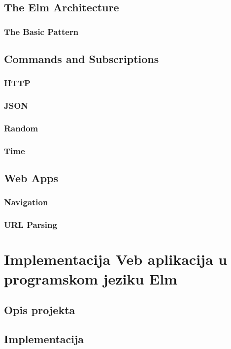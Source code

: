 \documentclass{viser-thesis}
\begin{document}
\subsection{The Elm Architecture}
\subsubsection{The Basic Pattern}

\subsection{Commands and Subscriptions}
\subsubsection{HTTP}
\subsubsection{JSON}
\subsubsection{Random}
\subsubsection{Time}

\subsection{Web Apps}
\subsubsection{Navigation}
\subsubsection{URL Parsing}

\newpage

\section{Implementacija Veb aplikacija u programskom jeziku Elm}

\subsection{Opis projekta}

\subsection{Implementacija}
\end{document}
